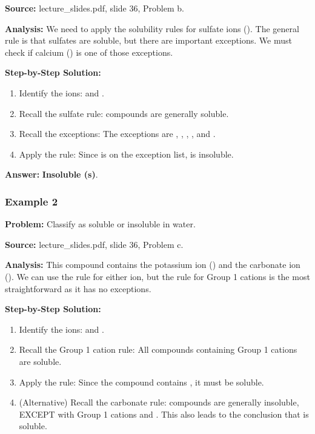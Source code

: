 \documentclass{article}
\begin{document}
\textbf{Source:} lecture\_slides.pdf, slide 36, Problem b.

\textbf{Analysis:} We need to apply the solubility rules for sulfate ions (). The general rule is that sulfates are soluble, but there are important exceptions. We must check if calcium () is one of those exceptions.

\textbf{Step-by-Step Solution:}
\begin{enumerate}
    \item Identify the ions:  and .
    \item Recall the sulfate rule:  compounds are generally soluble.
    \item Recall the exceptions: The exceptions are , , , , and .
    \item Apply the rule: Since  is on the exception list,  is insoluble.
\end{enumerate}

\textbf{Answer:} \textbf{Insoluble (s)}.

\subsubsection{Example 2}
\textbf{Problem:} Classify  as soluble or insoluble in water.

\textbf{Source:} lecture\_slides.pdf, slide 36, Problem c.

\textbf{Analysis:} This compound contains the potassium ion () and the carbonate ion (). We can use the rule for either ion, but the rule for Group 1 cations is the most straightforward as it has no exceptions.

\textbf{Step-by-Step Solution:}
\begin{enumerate}
    \item Identify the ions:  and .
    \item Recall the Group 1 cation rule: All compounds containing Group 1 cations are soluble.
    \item Apply the rule: Since the compound contains , it must be soluble.
    \item (Alternative) Recall the carbonate rule:  compounds are generally insoluble, EXCEPT with Group 1 cations and . This also leads to the conclusion that  is soluble.
\end{enumerate}
\end{document}
